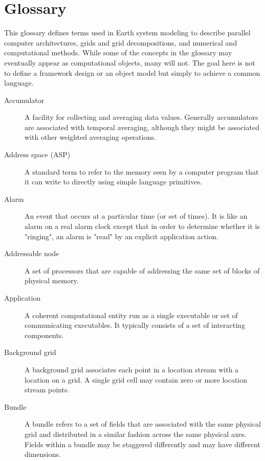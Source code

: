 \section{Glossary}
\label{sec:glos}

This glossary defines terms used in Earth system modeling to describe 
parallel computer architectures, grids and grid decompositions, and 
numerical and computational methods.  While some of the concepts in 
the glossary may eventually appear as computational objects, many 
will not.  The goal here is not to define a framework design or an 
object model but simply to achieve a common language.

\begin{description}

\item[Accumulator] \label{glos:Accumulator} A facility for collecting and 
  averaging data values.  Generally accumulators are associated with 
  temporal averaging, although they might be associated with 
  other weighted averaging operations.    
  
\item[Address space (ASP)] \label{glos:ASP}A standard term to refer to the memory
  seen by a computer program that it can write to directly using
  simple language primitives. 

\item[Alarm] \label{glos:Alarm} An event 
  that occurs at a particular time (or set of times).  It is like an
   alarm on a real alarm clock except that in order to determine whether 
it is "ringing", an alarm is "read" by an explicit application action.

\item[Addressable node] \label{glos:Anode} A set of processors that are
  capable of addressing the same set of blocks of physical memory.

\item[Application] \label{glos:Application} A coherent computational 
  entity run 
  as a single executable or set of communicating executables.  It 
  typically consists of a set of interacting components.

\item[Background grid] \label{glos:BackGrid} 
  A background grid associates each point in a location stream with a 
  location on a grid. A single grid cell may contain zero or more location 
  stream points.  

\item[Bundle] \label{glos:Bundle} A bundle refers to a set of fields that 
  are associated with the same physical grid and distributed in a similar 
  fashion across the same physical axes.  Fields within a bundle may be
  staggered differently and may have different dimensions.


\end{description}
